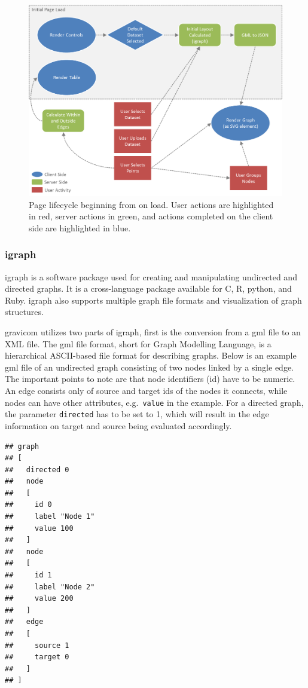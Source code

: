 \documentclass{article}\usepackage[]{graphicx}\usepackage[]{color}
\makeatletter
\newenvironment{kframe}{%
 \def\at@end@of@kframe{}%
 \ifinner\ifhmode%
  \def\at@end@of@kframe{\end{minipage}}%
  \begin{minipage}{\columnwidth}%
 \fi\fi%
 \def\FrameCommand##1{\hskip\@totalleftmargin \hskip-\fboxsep
 \colorbox{shadecolor}{##1}\hskip-\fboxsep
     \hskip-\linewidth \hskip-\@totalleftmargin \hskip\columnwidth}%
 \MakeFramed {\advance\hsize-\width
   \@totalleftmargin\z@ \linewidth\hsize
   \@setminipage}}%
 {\par\unskip\endMakeFramed%
 \at@end@of@kframe}
\newenvironment{knitrout}{}{} %
\makeatother
\begin{document}
\begin{figure}[H]
\centering
\includegraphics[width=\textwidth]{images/pagelifecycle.png}
\caption{\label{fig:pagelifecycle} Page lifecycle beginning from on load. User actions are highlighted in red, server actions in green, and actions completed on the client side are highlighted in blue.}
\end{figure}


\subsubsection{igraph}

igraph \cite{gc-igraph} is a software package used for creating and manipulating undirected and directed graphs. It is a cross-language package available for C, R, python, and Ruby. igraph also supports multiple graph file formats and visualization of graph structures.

gravicom utilizes two parts of igraph, first is the conversion from a gml file to an XML file. The gml file format, short for Graph Modelling Language, is a hierarchical ASCII-based file format for describing graphs. Below is an example gml file of an undirected graph consisting of two nodes linked by a single edge. The important points to note are that  node identifiers (id) have to be numeric. An edge consists only of source and target ids of the nodes it connects, while  nodes can have other attributes, e.g.~{\tt value} in the example. For a directed graph, the parameter {\tt directed} has to be set to 1, which will result in the edge information on target and source being evaluated accordingly.
\begin{knitrout}
\color{fgcolor}\begin{kframe}
\begin{verbatim}
## graph
## [
##   directed 0
##   node
##   [
##     id 0
##     label "Node 1"
##     value 100
##   ]
##   node
##   [
##     id 1
##     label "Node 2"
##     value 200
##   ]
##   edge
##   [
##     source 1
##     target 0
##   ]
## ]
\end{verbatim}
\end{kframe}
\end{knitrout}
\end{document}

